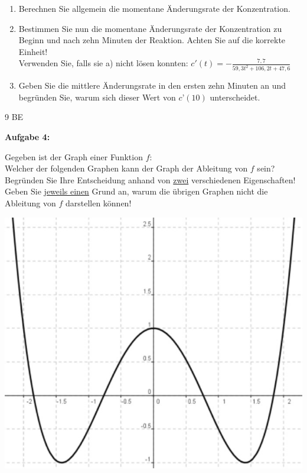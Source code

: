 \documentclass[a4paper,12pt]{article}
\newcommand{\Aufgabe}[1]{
  {
  \vspace*{0.5cm}
  \textsf{\textbf{Aufgabe #1}}
  \vspace*{0.2cm}
  
  }
}
\begin{document}


\begin{enumerate}[label={\alph*)}]
\item Berechnen Sie allgemein die momentane Änderungsrate der Konzentration.
\item Bestimmen Sie nun die momentane Änderungsrate der Konzentration zu Beginn und nach zehn Minuten der Reaktion. Achten Sie auf die korrekte Einheit!\\
  \lbrack Verwenden Sie, falls sie a) nicht lösen konnten:
    $c'(t) = -\frac{7,7}{59,3t^2+106,2t+47,6}$\rbrack

\item Geben Sie die mittlere Änderungsrate in den ersten zehn Minuten an und begründen Sie, warum sich dieser Wert von $c’(10)$ unterscheidet.

\end{enumerate}

\begin{flushright}9 BE \end{flushright}

\Aufgabe{4:}

\begin{minipage}{0.5\linewidth}
Gegeben ist der Graph einer Funktion $f$:\\

Welcher der folgenden Graphen kann der Graph der Ableitung von $f$ sein?\\

Begründen Sie Ihre Entscheidung anhand von \underline{zwei} verschiedenen Eigenschaften!\\

Geben Sie \underline{jeweils einen} Grund an, warum die übrigen Graphen nicht die Ableitung von $f$ darstellen können!

\end{minipage}\hfil
\begin{minipage}{0.5\linewidth}
    \includegraphics[width=0.8\linewidth]{Q11_210111_4.jpg}
\end{minipage}
\end{document}
